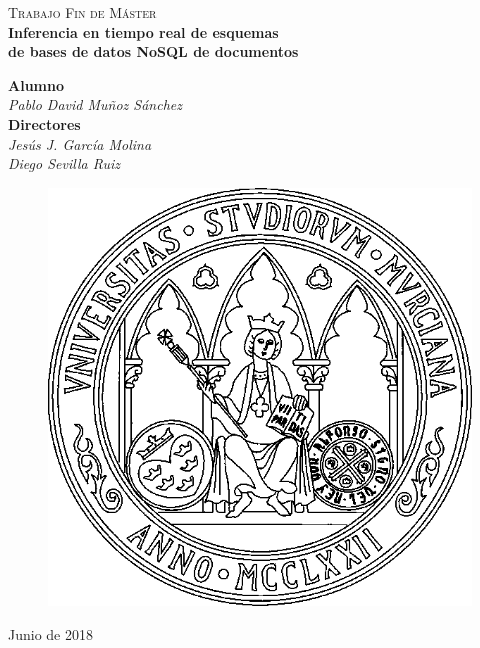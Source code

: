 \documentclass[spanish,11pt,twoside,openany]{scrbook}
\def\bf{\normalfont\bfseries}
\def\sc{\scshape}
\def\sf{\sffamily}
\begin{document}
\thispagestyle{empty}
\sloppy

\setmonofont{Inconsolata-Regular.ttf}


\begin{titlepage}
\thispagestyle{empty}
\vfill\vspace*{1cm}
\begin{center}
{\sc Trabajo Fin de Máster}\\
\vspace{.5cm}
{\huge\sf\bfseries Inferencia en tiempo real de esquemas}\\
{\huge\sf\bfseries de bases de datos NoSQL de documentos}\\[3.3cm]

\begin{large}
{\bf Alumno}\\
\emph{Pablo David Muñoz Sánchez}\\[1cm]

{\bf Directores}\\
\emph{Jesús J. García Molina}\\
\emph{Diego Sevilla Ruiz}\\
\end{large}
\vfill
\begin{figure}[h!]
\centerline{\includegraphics[width=.35\textwidth]{escudoum.png}}
\end{figure}
\vfill
Junio de 2018
\end{center}
\end{titlepage}
\restoregeometry

\cleardoublepage

%

\cleardoublepage

\tableofcontents
\cleardoublepage



\cleardoublepage
\end{document}
